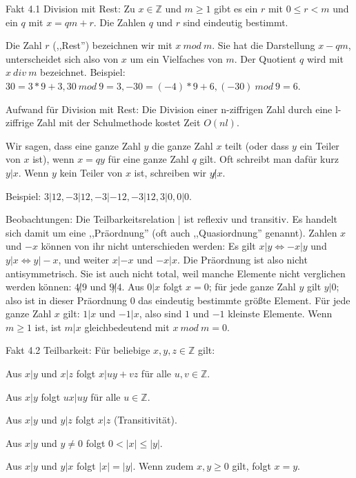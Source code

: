 \documentclass[a4paper]{article}
\begin{document}
\begin{multicols}{3}
    Fakt 4.1 Division mit Rest: Zu $x\in\mathbb{Z}$ und $m\geq 1$ gibt es ein $r$ mit $0\leq r < m$ und ein $q$ mit $x=qm+r$. Die Zahlen $q$ und $r$ sind eindeutig bestimmt.

    Die Zahl $r$ (,,Rest'') bezeichnen wir mit $x\ mod\ m$. Sie hat die Darstellung $x-qm$, unterscheidet sich also von $x$ um ein Vielfaches von $m$. Der Quotient $q$ wird mit $x\ div\ m$ bezeichnet.
    Beispiel: $30 = 3*9 + 3, 30\ mod\ 9 = 3, -30 = (-4) *9 + 6, (-30)\ mod\ 9 = 6$.

    Aufwand für Division mit Rest: Die Division einer n-ziffrigen Zahl durch eine l-ziffrige Zahl mit der Schulmethode kostet Zeit $O(nl)$.

    Wir sagen, dass eine ganze Zahl $y$ die ganze Zahl $x$ teilt (oder dass $y$ ein Teiler von $x$ ist), wenn $x=qy$ für eine ganze Zahl $q$ gilt. Oft schreibt man dafür kurz $y|x$. Wenn $y$ kein Teiler von $x$ ist, schreiben wir $y\not|x$.

    Beispiel: $3|12,-3|12,-3|-12,-3|12,3|0,0|0$.

    Beobachtungen: Die Teilbarkeitsrelation $|$ ist reflexiv und transitiv. Es handelt sich damit um eine ,,Präordnung'' (oft auch ,,Quasiordnung'' genannt). Zahlen $x$ und $-x$ können von ihr nicht unterschieden werden: Es gilt $x|y\Leftrightarrow -x|y$ und $y|x\Leftrightarrow y|-x$, und weiter $x|-x$ und $-x|x$. Die Präordnung ist also nicht antisymmetrisch. Sie ist auch nicht total, weil manche Elemente nicht verglichen werden können: $4\not|9$ und $9\not|4$. Aus $0|x$ folgt $x=0$; für jede ganze Zahl $y$ gilt $y|0$; also ist in dieser Präordnung $0$ das eindeutig bestimmte größte Element. Für jede ganze Zahl $x$ gilt: $1|x$ und $-1|x$, also sind $1$ und $-1$ kleinste Elemente. Wenn $m\geq 1$ ist, ist $m|x$ gleichbedeutend mit $x\ mod\ m= 0$.

    Fakt 4.2 Teilbarkeit: Für beliebige $x,y,z\in\mathbb{Z}$ gilt:
    \begin{enumerate*}
        \item Aus $x|y$ und $x|z$ folgt $x|uy+vz$ für alle $u,v\in\mathbb{Z}$.
        \item Aus $x|y$ folgt $ux|uy$ für alle $u\in\mathbb{Z}$.
        \item Aus $x|y$ und $y|z$ folgt $x|z$ (Transitivität).
        \item Aus $x|y$ und $y\not= 0$ folgt $0<|x|\leq |y|$.
        \item Aus $x|y$ und $y|x$ folgt $|x|=|y|$. Wenn zudem $x,y\geq 0$ gilt, folgt $x=y$.
    \end{enumerate*}


\end{multicols}
\end{document}
